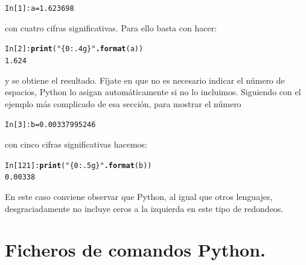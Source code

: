 \documentclass[10pt,a4paper]{article}\usepackage[]{graphicx}\usepackage[]{color}
\makeatletter
\newcommand{\hlnum}[1]{\textcolor[rgb]{0.686,0.059,0.569}{#1}}%
\newcommand{\hlstr}[1]{\textcolor[rgb]{0.192,0.494,0.8}{#1}}%
\newcommand{\hlopt}[1]{\textcolor[rgb]{0,0,0}{#1}}%
\newcommand{\hlstd}[1]{\textcolor[rgb]{0.345,0.345,0.345}{#1}}%
\newcommand{\hlkwb}[1]{\textcolor[rgb]{0.69,0.353,0.396}{#1}}%
\newcommand{\hlkwd}[1]{\textcolor[rgb]{0.737,0.353,0.396}{\textbf{#1}}}%
\newenvironment{kframe}{%
 \def\at@end@of@kframe{}%
 \ifinner\ifhmode%
  \def\at@end@of@kframe{\end{minipage}}%
  \begin{minipage}{\columnwidth}%
 \fi\fi%
 \def\FrameCommand##1{\hskip\@totalleftmargin \hskip-\fboxsep
 \colorbox{shadecolor}{##1}\hskip-\fboxsep
     \hskip-\linewidth \hskip-\@totalleftmargin \hskip\columnwidth}%
 \MakeFramed {\advance\hsize-\width
   \@totalleftmargin\z@ \linewidth\hsize
   \@setminipage}}%
 {\par\unskip\endMakeFramed%
 \at@end@of@kframe}
\newenvironment{knitrout}{}{} %
\makeatother
\begin{document}
\begin{knitrout}
\color{fgcolor}\begin{kframe}
\begin{alltt}
\hlstd{In [}\hlnum{1}\hlstd{]}\hlopt{:} \hlstd{a} \hlkwb{=} \hlnum{1.623698}
\end{alltt}
\end{kframe}
\end{knitrout}
con cuatro cifras significativas. Para ello basta con hacer:
\begin{knitrout}
\color{fgcolor}\begin{kframe}
\begin{alltt}
In [2]: \hlkwd{print}(\hlstr{"\{0:.4g\}"}\hlkwd{.format}(a))
1.624
\end{alltt}
\end{kframe}
\end{knitrout}
y se obtiene el resultado. Fíjate en que no es necesario indicar el número de espacios, Python lo asigan automáticamente si no lo incluimos. Siguiendo con el ejemplo más complicado de esa sección, para mostrar el número
\begin{knitrout}
\color{fgcolor}\begin{kframe}
\begin{alltt}
\hlstd{In [}\hlnum{3}\hlstd{]}\hlopt{:} \hlstd{b} \hlkwb{=} \hlnum{0.00337995246}
\end{alltt}
\end{kframe}
\end{knitrout}
con cinco cifras significativas hacemos:
\begin{knitrout}
\color{fgcolor}\begin{kframe}
\begin{alltt}
In [121]: \hlkwd{print}(\hlstr{"\{0:.5g\}"}\hlkwd{.format}(b))
0.00338
\end{alltt}
\end{kframe}
\end{knitrout}
En este caso conviene observar que Python, al igual que otros lenguajes, desgraciadamente no incluye ceros a la izquierda en este tipo de redondeos.

\section{Ficheros de comandos Python.}
\label{tut02:sec:ficherosComandosPython}
\end{document}
